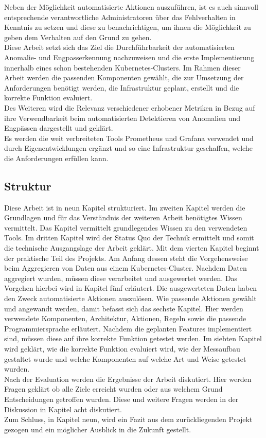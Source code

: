 \documentclass[a4paper,10pt]{scrartcl}
\begin{document}
Neben der Möglichkeit automatisierte Aktionen auszuführen, ist es auch sinnvoll entsprechende verantwortliche Administratoren über das Fehlverhalten in Kenntnis zu setzen und diese zu benachrichtigen, um ihnen die Möglichkeit zu geben dem Verhalten auf den Grund zu gehen.\\
Diese Arbeit setzt sich das Ziel die Durchführbarkeit der automatisierten Anomalie- und Engpasserkennung nachzuweisen und die erste Implementierung innerhalb eines schon bestehenden Kubernetes-Clusters. 
Im Rahmen dieser Arbeit werden die passenden Komponenten gewählt, die zur Umsetzung der Anforderungen benötigt werden, die Infrastruktur geplant, erstellt und die korrekte Funktion evaluiert.\\
Des Weiteren wird die Relevanz verschiedener erhobener Metriken in Bezug auf ihre Verwendbarkeit beim automatisierten Detektieren von Anomalien und Engpässen dargestellt und geklärt.\\
Es werden die weit verbreiteten Tools Prometheus und Grafana verwendet und durch Eigenentwicklungen ergänzt und so eine Infrastruktur geschaffen, welche die Anforderungen erfüllen kann.

\subsection{Struktur}

Diese Arbeit ist in neun Kapitel strukturiert. Im zweiten Kapitel werden die Grundlagen und für das Verständnis der weiteren Arbeit benötigtes Wissen vermittelt. Das Kapitel vermittelt grundlegendes Wissen zu den verwendeten Tools. Im dritten Kapitel wird der Status Quo der Technik ermittelt und somit die technische Ausgangslage der Arbeit geklärt. Mit dem vierten Kapitel beginnt der praktische Teil des Projekts. Am Anfang dessen steht die Vorgehensweise beim Aggregieren von Daten aus einem Kubernetes-Cluster. Nachdem Daten aggregiert wurden, müssen diese verarbeitet und ausgewertet werden. Das Vorgehen hierbei wird in Kapitel fünf erläutert. Die ausgewerteten Daten haben den Zweck automatisierte Aktionen auszulösen. Wie passende Aktionen gewählt und angewandt werden, damit befasst sich das sechste Kapitel.
Hier werden verwendete Komponenten, Architektur, Aktionen, Regeln sowie die passende Programmiersprache erläutert. Nachdem die geplanten Features implementiert sind, müssen diese auf ihre korrekte Funktion getestet werden. Im siebten Kapitel wird geklärt, wie die korrekte Funktion evaluiert wird, wie der Messaufbau gestaltet wurde und welche Komponenten auf welche Art und Weise getestet wurden.\\
Nach der Evaluation werden die Ergebnisse der Arbeit diskutiert. Hier werden Fragen geklärt  ob alle Ziele erreicht wurden oder aus welchem Grund Entscheidungen getroffen wurden. Diese und weitere Fragen werden in der Diskussion in Kapitel acht diskutiert.\\
Zum Schluss, in Kapitel neun, wird ein Fazit aus dem zurückliegenden Projekt gezogen und ein möglicher Ausblick in die Zukunft gestellt.
\end{document}
